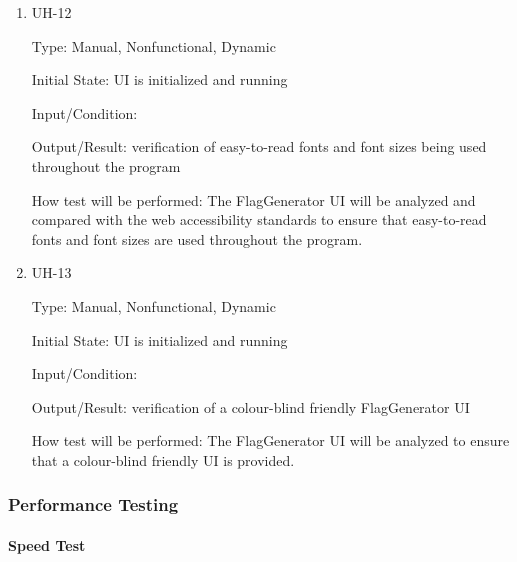 \documentclass[12pt, titlepage]{article}
\begin{document}
\begin{enumerate}

\item{UH-12\\}

Type: Manual, Nonfunctional, Dynamic

Initial State: UI is initialized and running

Input/Condition: 

Output/Result: verification of easy-to-read fonts and font sizes being used
throughout the program

How test will be performed: The FlagGenerator UI will be analyzed and compared
with the web accessibility standards to ensure that easy-to-read fonts and
font sizes are used throughout the program.

\item{UH-13\\}

Type: Manual, Nonfunctional, Dynamic

Initial State: UI is initialized and running

Input/Condition: 

Output/Result: verification of a colour-blind friendly FlagGenerator UI

How test will be performed: The FlagGenerator UI will be analyzed to ensure
that a colour-blind friendly UI is provided.

\end{enumerate}

\subsubsection{Performance Testing}

\paragraph{Speed Test}
\end{document}
